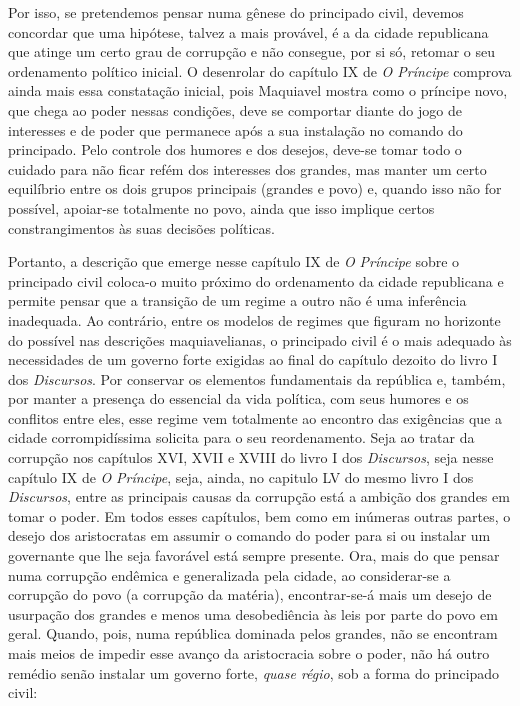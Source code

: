 Por isso, se pretendemos pensar numa gênese do principado civil, devemos
concordar que uma hipótese, talvez a mais provável, é a da cidade
republicana que atinge um certo grau de corrupção e não consegue, por si
só, retomar o seu ordenamento político inicial. O desenrolar do capítulo
IX de \emph{O Príncipe} comprova ainda mais essa constatação inicial,
pois Maquiavel mostra como o príncipe novo, que chega ao poder nessas
condições, deve se comportar diante do jogo de interesses e de poder que
permanece após a sua instalação no comando do principado. Pelo controle
dos humores e dos desejos, deve-se tomar todo o cuidado para não ficar
refém dos interesses dos grandes, mas manter um certo equilíbrio entre
os dois grupos principais (grandes e povo) e, quando isso não for
possível, apoiar-se totalmente no povo, ainda que isso implique certos
constrangimentos às suas decisões políticas.

Portanto, a descrição que emerge nesse capítulo IX de \emph{O}
\emph{Príncipe} sobre o principado civil coloca-o muito próximo do
ordenamento da cidade republicana e permite pensar que a transição de um
regime a outro não é uma inferência inadequada. Ao contrário, entre os
modelos de regimes que figuram no horizonte do possível nas descrições
maquiavelianas, o principado civil é o mais adequado às necessidades de
um governo forte exigidas ao final do capítulo dezoito do livro I dos
\emph{Discursos}. Por conservar os elementos fundamentais da república
e, também, por manter a presença do essencial da vida política, com seus
humores e os conflitos entre eles, esse regime vem totalmente ao
encontro das exigências que a cidade corrompidíssima solicita para o seu
reordenamento. Seja ao tratar da corrupção nos capítulos XVI, XVII e
XVIII do livro I dos \emph{Discursos}, seja nesse capítulo IX de
\emph{O} \emph{Príncipe}, seja, ainda, no capitulo LV do mesmo livro I
dos \emph{Discursos}, entre as principais causas da corrupção está a
ambição dos grandes em tomar o poder. Em todos esses capítulos, bem como
em inúmeras outras partes, o desejo dos aristocratas em assumir o
comando do poder para si ou instalar um governante que lhe seja
favorável está sempre presente. Ora, mais do que pensar numa corrupção
endêmica e generalizada pela cidade, ao considerar-se a corrupção do
povo (a corrupção da matéria), encontrar-se-á mais um desejo de
usurpação dos grandes e menos uma desobediência às leis por parte do
povo em geral. Quando, pois, numa república dominada pelos grandes, não
se encontram mais meios de impedir esse avanço da aristocracia sobre o
poder, não há outro remédio senão instalar um governo forte, \emph{quase
régio}, sob a forma do principado civil:

